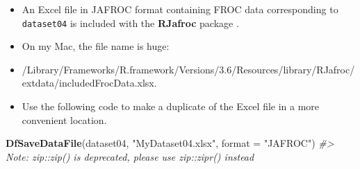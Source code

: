 \documentclass[]{book}
\newenvironment{Shaded}{\begin{snugshade}}{\end{snugshade}}
\newcommand{\CommentTok}[1]{\textcolor[rgb]{0.56,0.35,0.01}{\textit{#1}}}
\newcommand{\DataTypeTok}[1]{\textcolor[rgb]{0.13,0.29,0.53}{#1}}
\newcommand{\KeywordTok}[1]{\textcolor[rgb]{0.13,0.29,0.53}{\textbf{#1}}}
\newcommand{\NormalTok}[1]{#1}
\newcommand{\OperatorTok}[1]{\textcolor[rgb]{0.81,0.36,0.00}{\textbf{#1}}}
\newcommand{\OtherTok}[1]{\textcolor[rgb]{0.56,0.35,0.01}{#1}}
\newcommand{\StringTok}[1]{\textcolor[rgb]{0.31,0.60,0.02}{#1}}
\providecommand{\tightlist}{%
  \setlength{\itemsep}{0pt}\setlength{\parskip}{0pt}}
\begin{document}
\begin{itemize}
\tightlist
\item
  An Excel file in JAFROC format containing FROC data corresponding to \texttt{dataset04} is included with the \textbf{RJafroc} package \citep{RN1882}.
\end{itemize}

\begin{Shaded}
\end{Shaded}

\begin{itemize}
\tightlist
\item
  On my Mac, the file name is huge:
\item
  /Library/Frameworks/R.framework/Versions/3.6/Resources/library/RJafroc/extdata/includedFrocData.xlsx.
\item
  Use the following code to make a duplicate of the Excel file in a more convenient location.
\end{itemize}

\begin{Shaded}
\begin{Highlighting}[]
\KeywordTok{DfSaveDataFile}\NormalTok{(dataset04, }\StringTok{"MyDataset04.xlsx"}\NormalTok{, }\DataTypeTok{format =} \StringTok{"JAFROC"}\NormalTok{)}
\CommentTok{#> Note: zip::zip() is deprecated, please use zip::zipr() instead}
\end{Highlighting}
\end{Shaded}
\end{document}

